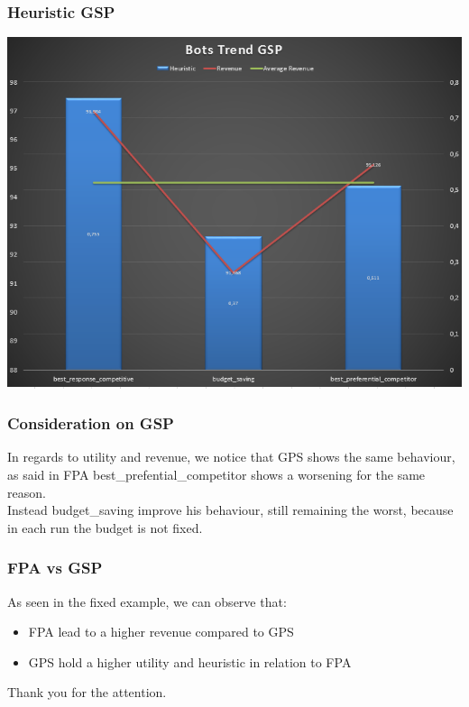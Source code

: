 \documentclass{beamer}
\begin{document}
\begin{frame}
\frametitle{Heuristic GSP}
\begin{center}
\includegraphics[scale=0.46]{img/Auctions/RGSP_all_Heuristic.PNG}
\end{center}
\end{frame}

\begin{frame}
\frametitle{Consideration on GSP}
In regards to utility and revenue, we notice that GPS shows the \alert{same} behaviour, as said in FPA best\_prefential\_competitor shows a \alert{worsening} for the same reason.\\
\medskip
Instead budget\_saving \alert{improve} his behaviour, still remaining the worst, because in each run the budget is not fixed.
\end{frame}

\begin{frame}
\frametitle{FPA vs GSP}
As seen in the fixed example, we can observe that:
\begin{itemize}
\item FPA lead to a \alert{higher} revenue compared to GPS
\item GPS hold a \alert{higher} utility and heuristic in relation to FPA
\end{itemize}
\end{frame}

\begin{frame}
\centering 
\Huge{Thank you for the attention.}
\end{frame}
\end{document}
